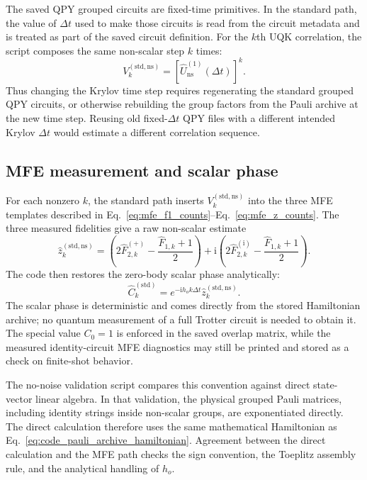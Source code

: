 \documentclass[11pt]{article}
\newcommand{\ii}{\mathrm{i}}
\begin{document}
The saved QPY grouped circuits are fixed-time primitives.  In the standard path, the value of $\Delta t$ used to make those circuits is read from the circuit metadata and is treated as part of the saved circuit definition.  For the $k$th UQK correlation, the script composes the same non-scalar step $k$ times:
\begin{equation}
    V_k^{\mathrm{(std,ns)}}
    =
    \left[\hat{U}^{(1)}_{\mathrm{ns}}(\Delta t)\right]^k.
    \label{eq:code_standard_vk}
\end{equation}
Thus changing the Krylov time step requires regenerating the standard grouped QPY circuits, or otherwise rebuilding the group factors from the Pauli archive at the new time step.  Reusing old fixed-$\Delta t$ QPY files with a different intended Krylov $\Delta t$ would estimate a different correlation sequence.

\subsection{MFE measurement and scalar phase}

For each nonzero $k$, the standard path inserts $V_k^{\mathrm{(std,ns)}}$ into the three MFE templates described in Eq.~\eqref{eq:mfe_f1_counts}--Eq.~\eqref{eq:mfe_z_counts}.  The three measured fidelities give a raw non-scalar estimate
\begin{equation}
    \widehat{z}^{\mathrm{(std,ns)}}_k
    =
    \left(2\widehat{F}_{2,k}^{(+)}-\frac{\widehat{F}_{1,k}+1}{2}\right)
    +
    \ii\left(2\widehat{F}_{2,k}^{(\ii)}-\frac{\widehat{F}_{1,k}+1}{2}\right).
\end{equation}
The code then restores the zero-body scalar phase analytically:
\begin{equation}
    \widehat{C}^{\mathrm{(std)}}_k
    =
    e^{-\ii h_o k\Delta t}
    \widehat{z}^{\mathrm{(std,ns)}}_k.
    \label{eq:code_standard_scalar_phase}
\end{equation}
The scalar phase is deterministic and comes directly from the stored Hamiltonian archive; no quantum measurement of a full Trotter circuit is needed to obtain it.  The special value $C_0=1$ is enforced in the saved overlap matrix, while the measured identity-circuit MFE diagnostics may still be printed and stored as a check on finite-shot behavior.

The no-noise validation script compares this convention against direct state-vector linear algebra.  In that validation, the physical grouped Pauli matrices, including identity strings inside non-scalar groups, are exponentiated directly.  The direct calculation therefore uses the same mathematical Hamiltonian as Eq.~\eqref{eq:code_pauli_archive_hamiltonian}.  Agreement between the direct calculation and the MFE path checks the sign convention, the Toeplitz assembly rule, and the analytical handling of $h_o$.
\end{document}
